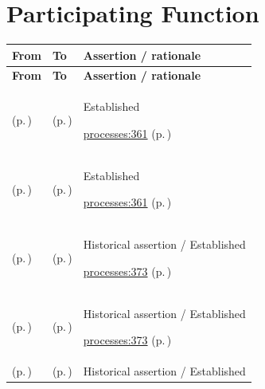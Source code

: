 \section{Participating Function}
\begingroup\small\setlength{\TableWidth}{\dimexpr\linewidth-6\tabcolsep-4\arrayrulewidth\relax}
\begin{longtable}{|>{\raggedright\arraybackslash}p{0.27\TableWidth}|>{\raggedright\arraybackslash}p{0.27\TableWidth}|>{\raggedright\arraybackslash}p{0.46\TableWidth}|}
\hline\rowcolor{TableHead}\textbf{From} & \textbf{To} & \textbf{Assertion / rationale}\\\hline\endfirsthead
\hline\rowcolor{TableHead}\textbf{From} & \textbf{To} & \textbf{Assertion / rationale}\\\hline\endhead
\hline\endfoot
\nameref{process:assurance-process-design} (p.\,\pageref{process:assurance-process-design}) & \nameref{function:design-service-assurance} (p.\,\pageref{function:design-service-assurance}) & Established

 \hyperref[rad:processes:357]{processes:361} (p.\,\pageref{rad:processes:357})\\\hline
\nameref{process:assurance-process-design} (p.\,\pageref{process:assurance-process-design}) & \nameref{function:manage-assurance-criteria} (p.\,\pageref{function:manage-assurance-criteria}) & Established

 \hyperref[rad:processes:357]{processes:361} (p.\,\pageref{rad:processes:357})\\\hline
\nameref{process:assurance-process-execution} (p.\,\pageref{process:assurance-process-execution}) & \nameref{function:establish-assurance-context} (p.\,\pageref{function:establish-assurance-context}) & Historical assertion / Established

 \hyperref[rad:processes:369]{processes:373} (p.\,\pageref{rad:processes:369})\\\hline
\nameref{process:assurance-process-execution} (p.\,\pageref{process:assurance-process-execution}) & \nameref{function:assess-assurance-evidence} (p.\,\pageref{function:assess-assurance-evidence}) & Historical assertion / Established

 \hyperref[rad:processes:369]{processes:373} (p.\,\pageref{rad:processes:369})\\\hline
\nameref{process:assurance-process-execution} (p.\,\pageref{process:assurance-process-execution}) & \nameref{function:adjudicate-assurance-assessment} (p.\,\pageref{function:adjudicate-assurance-assessment}) & Historical assertion / Established


\end{longtable}
